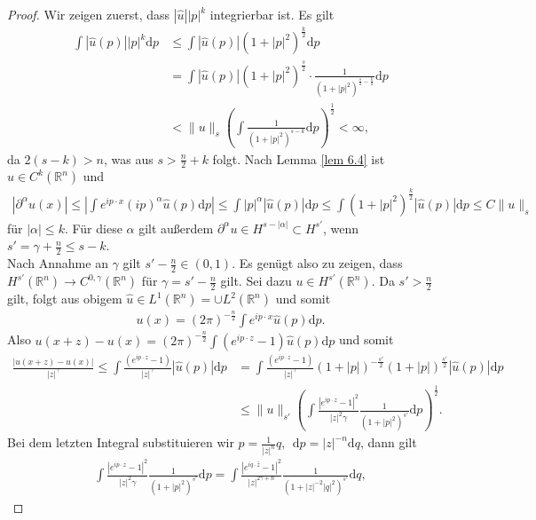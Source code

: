 \documentclass[
paper=a4,
bibtotocnumbered,
liststotocnumbered,
tablecaptionabove,
pointlessnumbers,
twoside,
openright,
10pt
]
{report}
\theoremstyle{definition}
\numberwithin{equation}{chapter}
\begin{document}
\begin{proof}
Wir zeigen zuerst, dass $|\widehat{u}| |p|^k$ integrierbar ist. Es gilt
\begin{align*}
\int |\widehat{u}(p)| |p|^k \mathrm{d}p &\leq \int |\widehat{u}(p)| (1+|p|^2)^{\frac{k}{2}} \mathrm{d}p 
\\ &=  \int  |\widehat{u}(p)| (1+|p|^2)^{\frac{s}{2}}\cdot \frac{1}{(1+|p|^2)^{{\frac{s}{2}} - \frac{k}{2}}} \mathrm{d}p 
\\& < \|u\|_s \left( \int \frac{1}{(1+|p|^2)^{s-k}} \mathrm{d}p \right)^{\frac{1}{2}} < \infty,
\end{align*}
da $2(s-k) >n$, was aus $s > \frac{n}{2} + k$ folgt. Nach Lemma \ref{lem 6.4} ist $u \in C^k(\mathbb{R}^n)$ und 
\begin{align*}
| \partial^\alpha u(x)| \leq \left| \int e^{ip \cdot x} (ip)^\alpha \widehat{u}(p) \mathrm{d}p \right| \leq \int |p|^\alpha | \widehat{u}(p)|\mathrm{d}p \leq \int (1+|p|^2)^{\frac{k}{2}}|\widehat{u}(p)|\mathrm{d}p \leq C\|u\|_s
\end{align*}
für $|\alpha| \leq k$. Für diese $\alpha$ gilt außerdem $\partial^\alpha u \in H^{s-|\alpha|} \subset H^{s'}$, wenn $s'= \gamma + \frac{n}{2} \leq s-k$.
\\ Nach Annahme an $\gamma$ gilt $s' - \frac{n}{2} \in (0,1).$ Es genügt also zu zeigen, dass $H^{s'}(\mathbb{R}^n) \rightarrow C^{0,\gamma}(\mathbb{R}^n)$ für $\gamma = s' - \frac{n}{2}$ gilt. Sei dazu $u \in H^{s'}(\mathbb{R}^n)$. Da $s'> \frac{n}{2}$ gilt, folgt aus obigem $\widehat{u} \in L^1(\mathbb{R}^n) = \cup L^2(\mathbb{R}^n)$ und somit
\begin{align*}
u(x) = (2 \pi)^{-\frac{n}{2}}\int e^{ip \cdot x} \widehat{u}(p)\mathrm{d}p.
\end{align*}
Also $u(x+z) - u(x) = (2 \pi)^{-\frac{n}{2}}\int (e^{ip \cdot z} -1)\widehat{u}(p)\mathrm{d}p$ und somit
\begin{align*}
\frac{|u(x+z) - u(x)|}{|z|^\gamma} \leq \int \frac{(e^{ip \cdot z} -1)}{|z|^\gamma}|\widehat{u}(p)|\mathrm{d}p &= \int \frac{(e^{ip \cdot z} -1)}{|z|^\gamma} (1+|p|)^{-\frac{s'}{2}}(1+|p|)^{\frac{s'}{2}}|\widehat{u}(p)|\mathrm{d}p 
\\ & \leq \|u\|_{s'} \left(\int \frac{|e^{ip \cdot z} -1|^2}{|z|^2\gamma} \frac{1}{(1+|p|^2)^{s'}} \mathrm{d}p \right)^{\frac{1}{2}}.
\end{align*}
Bei dem letzten Integral substituieren wir $p= \frac{1}{|z|^n}q,\ \ \mathrm{d}p = |z|^{-n}\mathrm{d}q$, dann gilt
\begin{align*}
\int \frac{|e^{ip \cdot z} -1|^2}{|z|^2\gamma} \frac{1}{(1+|p|^2)^{s'}} \mathrm{d}p = \int \frac{|e^{iq \cdot \widehat{z}} -1|^2}{|z|^{2\gamma+n}}  \frac{1}{(1+|z|^{-2}|q|^2)^{s'}}\mathrm{d}q,

\end{align*}
\end{proof}
\end{document}
